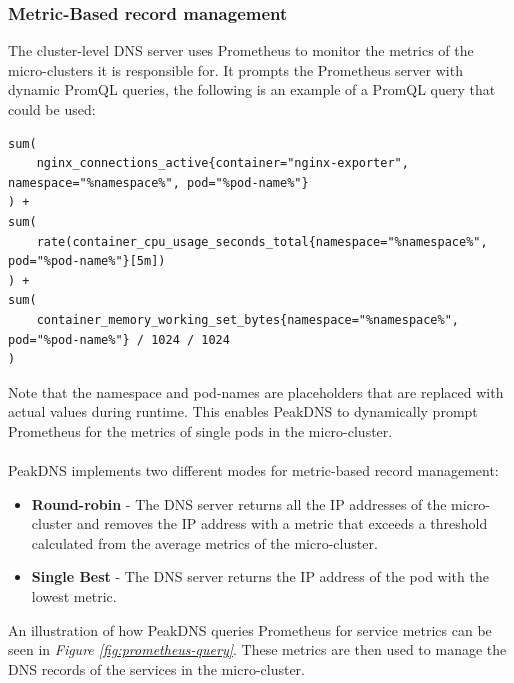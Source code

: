 \documentclass[12pt]{article}
\begin{document}
\subsubsection{Metric-Based record management}
The cluster-level DNS server uses Prometheus to monitor the metrics of the micro-clusters it is responsible for.
It prompts the Prometheus server with dynamic PromQL queries, the following is an example of a PromQL query that could be used:
\scriptsize
\begin{verbatim}
sum(
    nginx_connections_active{container="nginx-exporter", namespace="%namespace%", pod="%pod-name%"}
) +
sum(
    rate(container_cpu_usage_seconds_total{namespace="%namespace%", pod="%pod-name%"}[5m])
) +
sum(
    container_memory_working_set_bytes{namespace="%namespace%", pod="%pod-name%"} / 1024 / 1024
)
\end{verbatim}
\normalsize
Note that the namespace and pod-names are placeholders that are replaced with actual values during runtime.
This enables PeakDNS to dynamically prompt Prometheus for the metrics of single pods in the micro-cluster.
\\
\\
PeakDNS implements two different modes for metric-based record management:
\begin{itemize}
    \item \textbf{Round-robin} - The DNS server returns all the IP addresses of the micro-cluster and removes the IP address with a metric that exceeds 
    a threshold calculated from the average metrics of the micro-cluster.
    \item \textbf{Single Best} - The DNS server returns the IP address of the pod with the lowest metric.
\end{itemize}
An illustration of how PeakDNS queries Prometheus for service metrics can be seen in \textit{Figure \ref{fig:prometheus-query}}.
These metrics are then used to manage the DNS records of the services in the micro-cluster.
\end{document}
